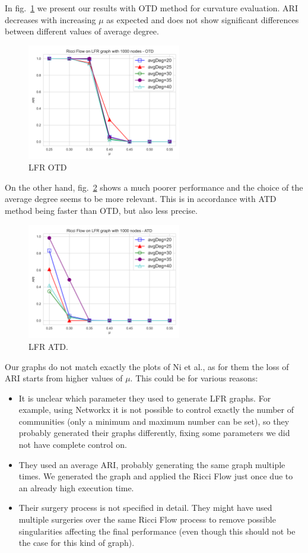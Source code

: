 In fig.~\ref{fig:LFR_OTD} we present our results with OTD method for curvature evaluation. ARI decreases with increasing $\mu$ as expected and does not show significant differences between different values of average degree.
\begin{figure}
    \centering
    \includegraphics[width=0.6\textwidth]{../tests/LFRResults/LFR_OTD.png}
    \caption{LFR OTD}
    \label{fig:LFR_OTD}
\end{figure}

On the other hand, fig.~\ref{fig:LFR_ATD} shows a much poorer performance and the choice of the average degree seems to be more relevant. This is in accordance with ATD method being faster than OTD, but also less precise.
\begin{figure}
    \centering
    \includegraphics[width=0.6\textwidth]{../tests/LFRResults/LFR_ATD.png}
    \caption{LFR ATD.}
    \label{fig:LFR_ATD}
\end{figure}

Our graphs do not match exactly the plots of Ni et al., as for them the loss of ARI starts from higher values of $\mu$. This could be for various reasons:
\begin{itemize}
    \item It is unclear which parameter they used to generate LFR graphs. For example, using Networkx it is not possible to control exactly the number of communities (only a minimum and maximum number can be set), so they probably generated their graphs differently, fixing some parameters we did not have complete control on.
    \item They used an average ARI, probably generating the same graph multiple times. We generated the graph and applied the Ricci Flow just once due to an already high execution time.
    \item Their surgery process is not specified in detail. They might have used multiple surgeries over the same Ricci Flow process to remove possible singularities affecting the final performance (even though this should not be the case for this kind of graph).
\end{itemize}